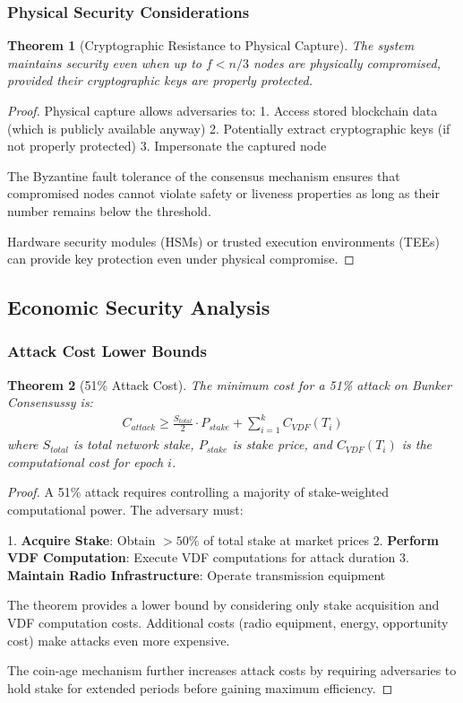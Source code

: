 \documentclass[11pt,a4paper]{article}
\newtheorem{theorem}{Theorem}[section]
\begin{document}
\subsubsection{Physical Security Considerations}

\begin{theorem}[Cryptographic Resistance to Physical Capture]
The system maintains security even when up to $f < n/3$ nodes are physically compromised, provided their cryptographic keys are properly protected.
\end{theorem}

\begin{proof}
Physical capture allows adversaries to:
1. Access stored blockchain data (which is publicly available anyway)
2. Potentially extract cryptographic keys (if not properly protected)
3. Impersonate the captured node

The Byzantine fault tolerance of the consensus mechanism ensures that compromised nodes cannot violate safety or liveness properties as long as their number remains below the threshold.

Hardware security modules (HSMs) or trusted execution environments (TEEs) can provide key protection even under physical compromise.
\end{proof}

\subsection{Economic Security Analysis}

\subsubsection{Attack Cost Lower Bounds}

\begin{theorem}[51\% Attack Cost]
The minimum cost for a 51\% attack on Bunker Consensussy is:
\begin{align}
C_{attack} \geq \frac{S_{total}}{2} \cdot P_{stake} + \sum_{i=1}^{k} C_{VDF}(T_i)
\end{align}
where $S_{total}$ is total network stake, $P_{stake}$ is stake price, and $C_{VDF}(T_i)$ is the computational cost for epoch $i$.
\end{theorem}

\begin{proof}
A 51\% attack requires controlling a majority of stake-weighted computational power. The adversary must:

1. \textbf{Acquire Stake}: Obtain $> 50\%$ of total stake at market prices
2. \textbf{Perform VDF Computation}: Execute VDF computations for attack duration
3. \textbf{Maintain Radio Infrastructure}: Operate transmission equipment

The theorem provides a lower bound by considering only stake acquisition and VDF computation costs. Additional costs (radio equipment, energy, opportunity cost) make attacks even more expensive.

The coin-age mechanism further increases attack costs by requiring adversaries to hold stake for extended periods before gaining maximum efficiency.
\end{proof}
\end{document}
